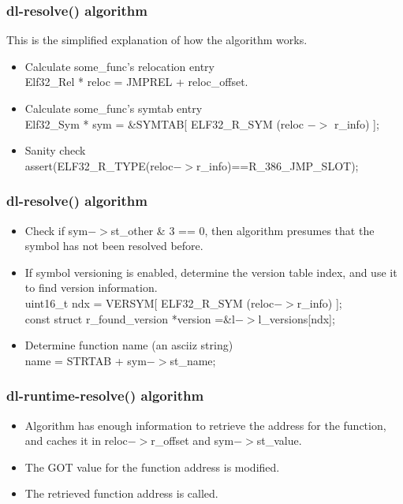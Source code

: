 \documentclass{beamer}
\begin{document}
\begin{frame}[fragile]
\frametitle{dl-resolve() algorithm}

This is the simplified explanation of how the algorithm works.

 \begin{itemize}
    \item  Calculate some\_func's relocation entry
    \\
    Elf32\_Rel * reloc = JMPREL + reloc\_offset.
    
    \item Calculate some\_func's symtab entry
    \\
    Elf32\_Sym * sym = \&SYMTAB[ ELF32\_R\_SYM (reloc $->$ r\_info) ];	
  	
  	\item Sanity check 
  	\\
  	assert(ELF32\_R\_TYPE(reloc$->$r\_info)==R\_386\_JMP\_SLOT);
  \end{itemize}

\end{frame}


\begin{frame}[fragile]
\frametitle{dl-resolve() algorithm}
 \begin{itemize}
    \item Check if sym$->$st\_other \& 3 == 0, then algorithm presumes that the symbol has not been resolved before.
    
    \item If symbol versioning is enabled, determine the version table index, and use it to find version information.
    \\
    uint16\_t ndx = VERSYM[ ELF32\_R\_SYM (reloc$->$r\_info) ]; 
    \\
    const struct r\_found\_version *version =\&l$->$l\_versions[ndx];
    
    \item Determine function name (an asciiz string)
    \\
    name = STRTAB + sym$->$st\_name;
  \end{itemize}

\end{frame}

\begin{frame}[fragile]
\frametitle{dl-runtime-resolve() algorithm}
 \begin{itemize}
    \item Algorithm has enough information to retrieve the address for the function, and caches it in reloc$->$r\_offset and sym$->$st\_value.
    
    \item The GOT value for the function address is modified.
    
    \item The retrieved function address is called.
  \end{itemize}

\end{frame}
\end{document}
